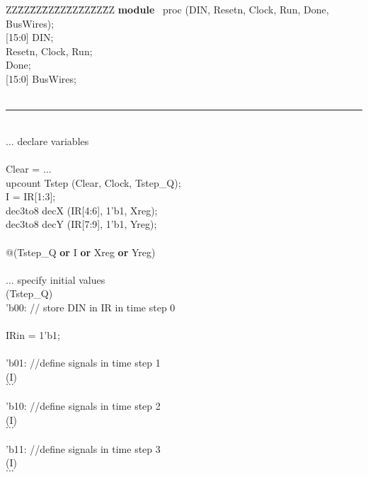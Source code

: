 \documentclass[epsfig,10pt,fullpage]{article}
\begin{document}
\begin{center}
\begin{minipage}[t]{12.5 cm}
\begin{tabbing}
ZZ\=ZZ\=ZZ\=ZZ\=ZZ\=ZZ\=ZZ\=ZZ\=ZZ\kill
{\bf module} ~proc (DIN, Resetn, Clock, Run, Done, BusWires);\\
 [15:0] DIN;\\
 Resetn, Clock, Run;\\
 Done;\\
 [15:0] BusWires;\\
~\rule{5.0in}{0in}\\
\>$\ldots$ declare variables\\
~\\
 Clear = $\ldots$\\
\>upcount Tstep (Clear, Clock, Tstep\_Q);\\
 I = IR[1:3];\\
\>dec3to8 decX (IR[4:6], 1'b1, Xreg);\\
\>dec3to8 decY (IR[7:9], 1'b1, Yreg);\\
\\
 @(Tstep\_Q {\bf or} I {\bf or} Xreg {\bf or} Yreg)\\
\\
\>\>$\ldots$ specify initial values\\
\> (Tstep\_Q)\\
\>\>'b00: // store DIN in IR in time step 0\\
\>\>\\
\>\>\>\>IRin = 1'b1;\\
\>\>\\
\>\>'b01:   //define signals in time step 1\\
\>\>\> (I)\\
\>\>\>\>\>$\ldots$ \\
\>\>\>\\
\>\>'b10:   //define signals in time step 2\\
\>\>\> (I)\\
\>\>\>\>\>$\ldots$ \\
\>\>\>\\
\>\>'b11:   //define signals in time step 3\\
\>\>\> (I)\\
\>\>\>\>\>$\ldots$ \\
\>\>\>\\

\end{tabbing}
\end{minipage}
\end{center}
\end{document}
